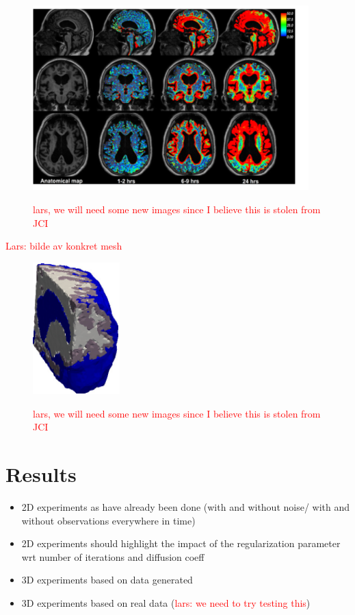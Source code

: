 \documentclass[11pt,a4paper]{article}
\renewcommand{\comment}[1]{\textcolor{red}{#1}}
\begin{document}
\begin{figure}
\includegraphics[width=0.95\textwidth]{GMRI.png} 
\label{fig1} 
\caption{\comment{lars, we will need some new images since I believe this is stolen from JCI}}
\end{figure}

\comment{Lars: bilde av konkret mesh  }

\begin{figure}
\includegraphics[width=0.3\textwidth]{mesh-eps-converted-to.pdf} 
\label{fig1} 
\caption{\comment{lars, we will need some new images since I believe this is stolen from JCI}}
\end{figure}


\section{Results}
\begin{itemize}
\item 2D experiments as have already been done (with and without noise/ with and without observations everywhere in time) 
\item 2D experiments should highlight the impact of the regularization parameter wrt number of iterations and diffusion 
coeff 
\item 3D experiments based on data generated  
\item 3D experiments based on real data (\comment{lars: we need to try testing this}) 
\end{itemize}
\end{document}
